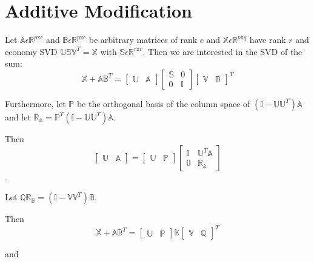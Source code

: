 \documentclass{article}
\begin{document}
\section{Additive Modification\label{additive}}
Let $\mathds{A} \epsilon \mathds{R}^{p\mathrm{x}c}$ and $\mathds{B} \epsilon \mathds{R}^{p\mathrm{x}c}$ be arbitrary matrices of rank $c$ and $\mathds{X}{\epsilon}{\mathds{R}^{p\mathrm{x}q}}$ have rank $r$ and economy SVD $\mathds{USV}^T = \mathds{X}$ with $\mathds{S}\epsilon\mathds{R}^{r\mathrm{x}r}$.
Then we are interested in the SVD of the sum:
$$
\mathds{X} + \mathds{AB}^T =
\begin{bmatrix}
\mathds{U} & \mathds{A}
\end{bmatrix}
\begin{bmatrix}
\mathds{S} & 0 \\
0 & \mathds{I}
\end{bmatrix}
\begin{bmatrix}
\mathds{V} & \mathds{B}
\end{bmatrix}^T
$$

Furthermore, let $\mathds{P}$ be the orthogonal basis of the column space of $(\mathds{I}-\mathds{UU}^T)\mathds{A}$ and let $\mathds{R_A}=\mathds{P}^T(\mathds{I}-\mathds{UU}^T)\mathds{A}$.

Then
$$
\begin{bmatrix}
\mathds{U} & \mathds{A}
\end{bmatrix}
=
\begin{bmatrix}
\mathds{U} & \mathds{P}
\end{bmatrix}
\begin{bmatrix}
\mathds{I} & \mathds{U}^T\mathds{A} \\
0 & \mathds{R_A}
\end{bmatrix}
$$.

Let $\mathds{QR_B}=(\mathds{I}-\mathds{VV}^T)\mathds{B}$.

Then
$$
\mathds{X}+\mathds{AB}^T =
\begin{bmatrix}
\mathds{U} & \mathds{P}
\end{bmatrix}
\mathds{K}
\begin{bmatrix}
\mathds{V} & \mathds{Q}
\end{bmatrix}^T
$$

and
\end{document}
